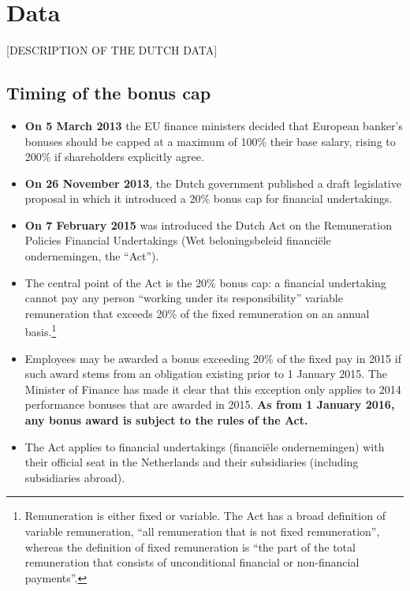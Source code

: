 \documentclass[12pt]{article}
\begin{document}
\section{Data} \label{data}


[DESCRIPTION OF THE DUTCH DATA]


\subsection{Timing of the bonus cap}
	
	
	\begin{itemize}
		\item \textbf{On 5 March 2013} the EU finance ministers decided that European banker's bonuses should be capped at a maximum of 100\% their base salary, rising to 200\% if shareholders explicitly agree. 
		\item \textbf{On 26 November 2013}, the Dutch government published a draft legislative proposal in which it introduced a 20\% bonus
		cap for financial undertakings. 
		\item \textbf{On 7 February 2015} was introduced the Dutch Act on the Remuneration Policies Financial Undertakings (Wet beloningsbeleid financiële ondernemingen, the ``Act'').
		\item The central point of the Act is the 20\% bonus cap: a financial undertaking cannot pay any person ``working under its responsibility'' variable remuneration that exceeds 20\% of the fixed remuneration on an annual
		basis.\footnote{Remuneration is either fixed or variable. The Act has a broad definition of variable remuneration, ``all remuneration that is not fixed remuneration'', whereas the definition of fixed remuneration is ``the part of the total remuneration that consists of unconditional financial or non-financial payments''.}
		\item Employees may be awarded a bonus exceeding 20\% of the fixed pay in 2015 if such award stems from an obligation existing prior to 1 January 2015. The Minister of Finance has made it clear that this exception only applies to 2014 performance bonuses that are awarded in 2015.\textbf{ As from 1 January 2016, any bonus award is subject to the rules of the Act.}
		\item The Act applies to financial undertakings (financiële ondernemingen) with their official seat in the Netherlands and their subsidiaries (including subsidiaries abroad).

\end{itemize}
\end{document}
